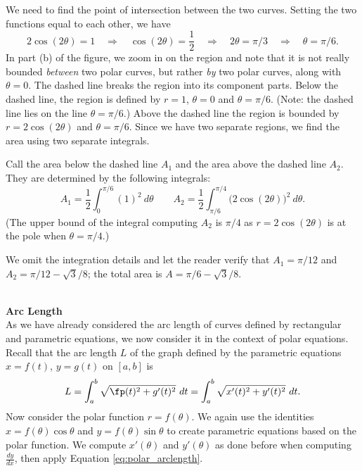 {We need to find the point of intersection between the two curves. Setting the two functions equal to each other, we have
$$2\cos(2\theta) = 1 \quad \Rightarrow \quad \cos(2\theta) = \frac12 \quad \Rightarrow \quad 2\theta = \pi/3\quad \Rightarrow \quad \theta=\pi/6.$$
In part (b) of the figure, we zoom in on the region and note that it is not really bounded \textit{between} two polar curves, but rather \textit{by} two polar curves, along with $\theta=0$. The dashed line breaks the region into its component parts. Below the dashed line, the region is defined by $r=1$, $\theta=0$ and $\theta = \pi/6$. (Note: the dashed line lies on the line $\theta=\pi/6$.) Above the dashed line the region is bounded by $r=2\cos(2\theta)$ and $\theta =\pi/6$. Since we have two separate regions, we find the area using two separate integrals.

Call the area below the dashed line $A_1$ and the area above the dashed line $A_2$. They are determined by the following integrals:
$$A_1 = \frac12\int_0^{\pi/6} (1)^2\ d\theta\qquad  A_2 = \frac12\int_{\pi/6}^{\pi/4} \big(2\cos(2\theta)\big)^2\ d\theta.$$
(The upper bound of the integral computing $A_2$ is $\pi/4$ as $r=2\cos(2\theta)$ is at the pole when $\theta=\pi/4$.)

We omit the integration details and let the reader verify that $A_1 = \pi/12$ and $A_2 = \pi/12-\sqrt{3}/8$; the total area is $A = \pi/6-\sqrt{3}/8$.
}\\

\noindent\textbf{\large Arc Length}\\

As we have already considered the arc length of curves defined by rectangular and parametric equations, we now consider it in the context of polar equations. Recall that the arc length $L$ of the graph defined by the parametric equations $x=f(t)$, $y=g(t)$ on $[a,b]$ is
\begin{equation}L = \int_a^b \sqrt{\fp(t)^2 + g'(t)^2}\ dt = \int_a^b \sqrt{x'(t)^2+y'(t)^2}\ dt.\label{eq:polar_arclength}\end{equation}
Now consider the polar function $r=f(\theta)$. We again use the identities $x=f(\theta)\cos\theta$ and $y=f(\theta)\sin\theta$ to create parametric equations based on the polar function. We compute $x'(\theta)$ and $y'(\theta)$ as done before when computing $\frac{dy}{dx}$, then apply Equation \eqref{eq:polar_arclength}.


